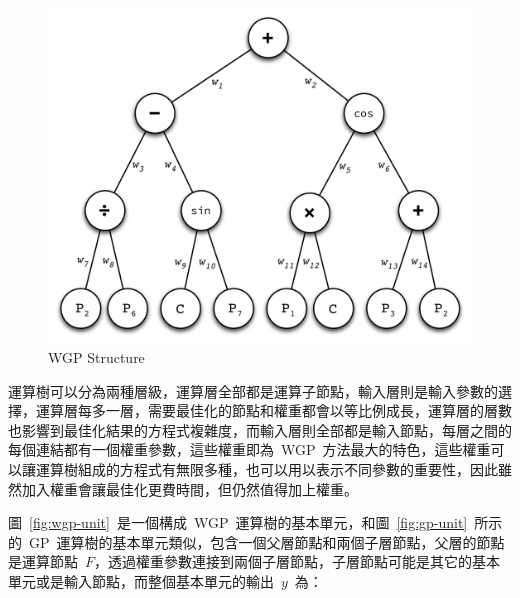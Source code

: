 \begin{figure}[hbtp]
  \begin{center}
    \includegraphics[width=1.0\textwidth]{figures/wgp-sample.pdf}
    \caption{WGP Structure} 
    \label{fig:WGP-sample}
  \end{center}
\end{figure}


運算樹可以分為兩種層級，運算層全部都是運算子節點，輸入層則是輸入參數的選擇，運算層每多一層，需要最佳化的節點和權重都會以等比例成長，運算層的層數也影響到最佳化結果的方程式複雜度，而輸入層則全部都是輸入節點，每層之間的每個連結都有一個權重參數，這些權重即為~WGP~方法最大的特色，這些權重可以讓運算樹組成的方程式有無限多種，也可以用以表示不同參數的重要性，因此雖然加入權重會讓最佳化更費時間，但仍然值得加上權重。

圖~\ref{fig:wgp-unit}~是一個構成~WGP~運算樹的基本單元，和圖~\ref{fig:gp-unit}~所示的~GP~運算樹的基本單元類似，包含一個父層節點和兩個子層節點，父層的節點是運算節點~$F$，透過權重參數連接到兩個子層節點，子層節點可能是其它的基本單元或是輸入節點，而整個基本單元的輸出~$y$~為：

